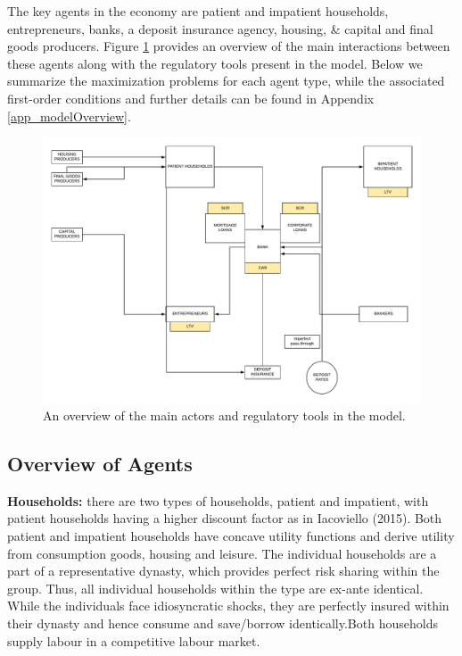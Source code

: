 \documentclass[12pt]{article}
\numberwithin{equation}{section}
\begin{document}
The key agents in the economy are patient and impatient households, entrepreneurs, banks, a deposit insurance agency, housing, \& capital and final goods producers. Figure \ref{model_overview} provides an overview of the main interactions between these agents along with the regulatory tools present in the model. Below we summarize the maximization problems for each agent type, while the associated first-order conditions and further details can be found in Appendix \ref{app_modelOverview}.


\begin{figure}[H]
\caption{An overview of the main actors and regulatory tools in the model.}
\label{model_overview}
\includegraphics[scale=0.5]{3d_flowchart_prud.pdf}
\end{figure}

\subsection{Overview of Agents}

\noindent
\textbf{Households:} there are two types of households, patient and impatient, with patient households having a higher discount factor as in Iacoviello (2015). Both patient and impatient households have concave utility functions and derive utility from consumption goods, housing and leisure. The individual households are a part of a representative dynasty, which provides perfect risk sharing within the group. Thus, all individual households within the type are ex-ante identical. While the individuals face idiosyncratic shocks, they are perfectly insured within their dynasty and hence consume and save/borrow identically.Both households supply labour in a competitive labour market.
\end{document}
